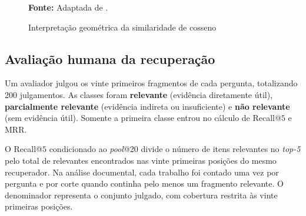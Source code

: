 \begin{figure}[!htbp]
\centering
\begin{minipage}{0.90\textwidth}
\caption{Interpretação geométrica da similaridade de cosseno}
\label{fig:similaridade-cosseno}
\par\smallskip
{\footnotesize\raggedright\textbf{Fonte:} Adaptada de \cite{manning2008ir}.\par}
\end{minipage}
\end{figure}

\subsection{Avaliação humana da recuperação}

Um avaliador julgou os vinte primeiros fragmentos de cada pergunta, totalizando 200 julgamentos. As classes foram \textbf{relevante} (evidência diretamente útil), \textbf{parcialmente relevante} (evidência indireta ou insuficiente) e \textbf{não relevante} (sem evidência útil). Somente a primeira classe entrou no cálculo de Recall@$5$ e MRR.

O Recall@$5$ condicionado ao \textit{pool}@20 divide o número de itens relevantes no \textit{top-5} pelo total de relevantes encontrados nas vinte primeiras posições do mesmo recuperador. Na análise documental, cada trabalho foi contado uma vez por pergunta e por corte quando continha pelo menos um fragmento relevante. O denominador representa o conjunto julgado, com cobertura restrita às vinte primeiras posições.

